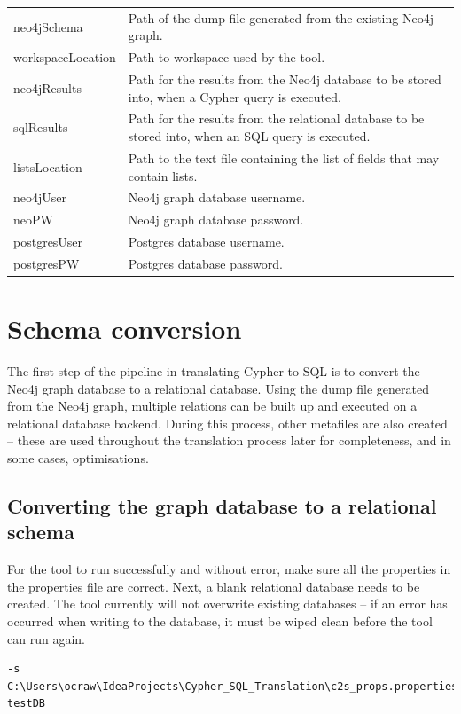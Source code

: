 \documentclass[letterpaper]{ltxdoc}
\begin{document}
\begin{center}
\begin{tabular}{ p{3cm} p{10.5cm} }
neo4jSchema & Path of the dump file generated from the existing Neo4j graph. \\
workspaceLocation & Path to workspace used by the tool. \\
neo4jResults & Path for the results from the Neo4j database to be stored into, when a Cypher query is executed. \\
sqlResults & Path for the results from the relational database to be stored into, when an SQL query is executed. \\
listsLocation & Path to the text file containing the list of fields that may contain lists. \\
neo4jUser & Neo4j graph database username. \\
neoPW & Neo4j graph database password. \\
postgresUser & Postgres database username. \\
postgresPW & Postgres database password. \\
\end{tabular}
\end{center}


\section{Schema conversion}
The first step of the pipeline in translating Cypher to SQL is to convert the Neo4j graph database to a relational database. Using the dump file generated from the Neo4j graph, multiple relations can be built up and executed on a relational database backend. During this process, other metafiles are also created -- these are used throughout the translation process later for completeness, and in some cases, optimisations.


\subsection{Converting the graph database to a relational schema}
For the tool to run successfully and without error, make sure all the properties in the properties file are correct. Next, a blank relational database needs to be created. The tool currently will not overwrite existing databases -- if an error has occurred when writing to the database, it must be wiped clean before the tool can run again.

\medskip

\begin{verbatim}
-s C:\Users\ocraw\IdeaProjects\Cypher_SQL_Translation\c2s_props.properties testDB
\end{verbatim}
\end{document}
